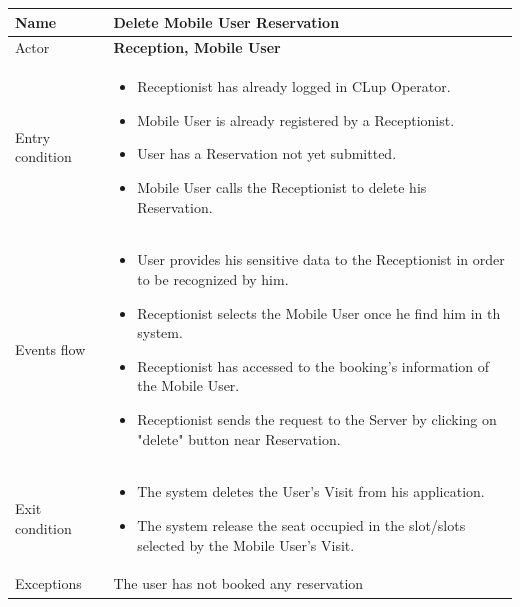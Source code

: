 \begin{tabular}{|p{5cm} | p{7cm} | }
	\hline
	Name & \textbf{Delete Mobile User Reservation} \\
	\hline
	Actor & \textbf{Reception, Mobile User} \\
	\hline
	Entry condition &
	\begin{itemize}
		\item Receptionist has already logged in CLup Operator. 
 		\item Mobile User is already registered by a Receptionist.
		\item User has a Reservation not yet submitted. 
        \item Mobile User calls the Receptionist to delete his Reservation.
	\end{itemize} \\
	\hline
	Events flow & 
	\begin{itemize}
		\item User provides his sensitive data to the Receptionist in order to be recognized by him. 
        \item Receptionist selects the Mobile User once he find him in th system.
		\item Receptionist has accessed to the booking's information of the Mobile User.
        \item Receptionist sends the request to the Server by clicking on "delete" button near Reservation.
	\end{itemize} \\
	\hline
	Exit condition & \begin{itemize}
	\item The system deletes the User’s Visit from his application.
    \item The system release the seat occupied in the slot/slots selected by the Mobile User’s Visit. \end{itemize} \\
	\hline 
	Exceptions & 
	The user has not booked any reservation \\
	\hline
\end{tabular}

